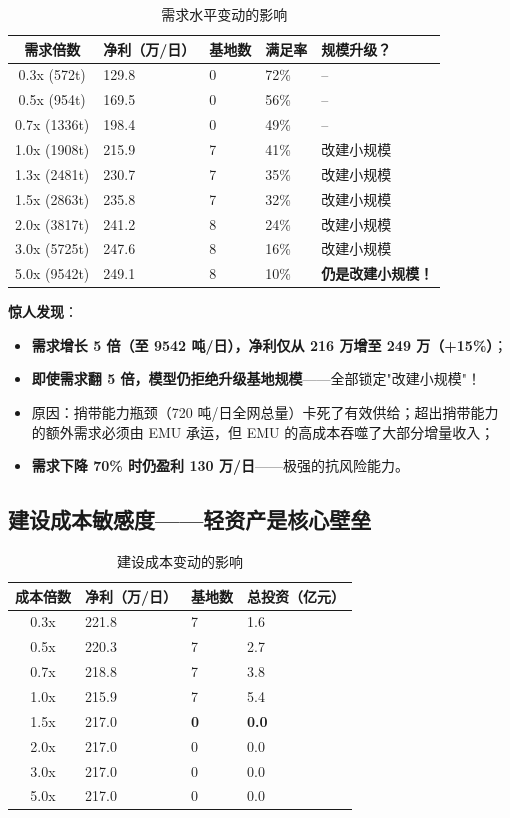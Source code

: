 \documentclass[12pt,a4paper,fontset=none]{ctexart}
\begin{document}
\begin{table}[H]
\centering\small
\caption{需求水平变动的影响}
\begin{tabular}{cC{2cm}C{2cm}C{2cm}C{2cm}}
\toprule
需求倍数 & 净利（万/日） & 基地数 & 满足率 & 规模升级？ \\
\midrule
0.3x (572t) & 129.8 & 0 & 72\% & -- \\
0.5x (954t) & 169.5 & 0 & 56\% & -- \\
0.7x (1336t) & 198.4 & 0 & 49\% & -- \\
1.0x (1908t) & 215.9 & 7 & 41\% & 改建小规模 \\
1.3x (2481t) & 230.7 & 7 & 35\% & 改建小规模 \\
1.5x (2863t) & 235.8 & 7 & 32\% & 改建小规模 \\
2.0x (3817t) & 241.2 & 8 & 24\% & 改建小规模 \\
3.0x (5725t) & 247.6 & 8 & 16\% & 改建小规模 \\
5.0x (9542t) & 249.1 & 8 & 10\% & \textbf{仍是改建小规模！} \\
\bottomrule
\end{tabular}
\end{table}

\textbf{惊人发现}：
\begin{itemize}
    \item \textbf{需求增长 5 倍（至 9542 吨/日），净利仅从 216 万增至 249 万（+15\%）}；
    \item \textbf{即使需求翻 5 倍，模型仍拒绝升级基地规模}——全部锁定"改建小规模"！
    \item 原因：捎带能力瓶颈（720 吨/日全网总量）卡死了有效供给；超出捎带能力的额外需求必须由 EMU 承运，但 EMU 的高成本吞噬了大部分增量收入；
    \item \textbf{需求下降 70\% 时仍盈利 130 万/日}——极强的抗风险能力。
\end{itemize}

\subsection{建设成本敏感度——轻资产是核心壁垒}

\begin{table}[H]
\centering\small
\caption{建设成本变动的影响}
\begin{tabular}{cC{2.2cm}C{2cm}C{2.2cm}}
\toprule
成本倍数 & 净利（万/日） & 基地数 & 总投资（亿元） \\
\midrule
0.3x & 221.8 & 7 & 1.6 \\
0.5x & 220.3 & 7 & 2.7 \\
0.7x & 218.8 & 7 & 3.8 \\
1.0x & 215.9 & 7 & 5.4 \\
\midrule
{}
1.5x & 217.0 & \textbf{0} & \textbf{0.0} \\
2.0x & 217.0 & 0 & 0.0 \\
3.0x & 217.0 & 0 & 0.0 \\
5.0x & 217.0 & 0 & 0.0 \\
\bottomrule
\end{tabular}
\end{table}
\end{document}
